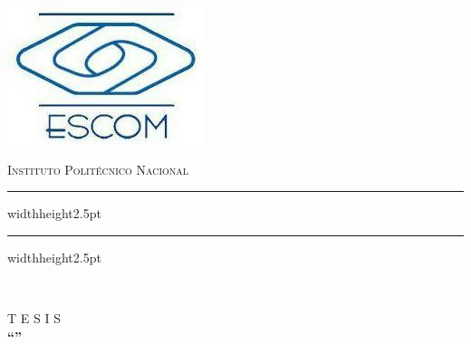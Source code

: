 \begin{adjustbox}{max width=1.2\linewidth, right}
\begin{minipage}[c][0.99\textheight][t]{0.13\textwidth}
            \centerline{\includegraphics[width=1.3\linewidth]{img/logo-school.png}}
        \end{minipage}
        \begin{minipage}[c][0.99\textheight][t]{0.95\textwidth}
            \centering
            {\fontsize{20}{20}\selectfont\textsc{Instituto Politécnico Nacional\\}}
            \vspace{10pt}
            \begin{minipage}[t]{0.1\textwidth}
            \end{minipage}
            \hfill
            \begin{minipage}[t]{0.9\textwidth}
                {\color{pantone_222_c} \hrule width\textwidth height2.5pt}
            \end{minipage}
            \begin{minipage}[t]{0.9\textwidth}
                {\color{black_cic} \hrule width\textwidth height2.5pt}
            \end{minipage}
            \begin{minipage}[t]{0.1\textwidth}
            \end{minipage}
            
            \vspace{20pt}
            {\fontsize{16}{16}\selectfont\textsc{\schoolname\\}}

            \vspace{60pt}
            {\fontsize{25}{20}\selectfont T E S I S\\}
            \vspace{60pt}
            {\fontsize{16}{16}\selectfont\textbf{``\thesisname''\\}}


\end{minipage}
\end{adjustbox}
